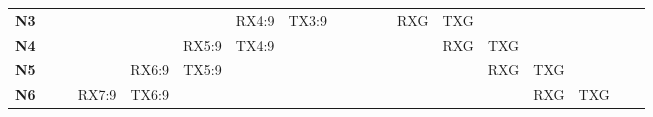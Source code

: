 \documentclass{tfgitic}[2024/07/01]
\begin{document}
{\begin{figure}
{\begin{tabular}{l||cccccccccccccccccc}
            \hhline{~||~~~~~---~~---~~~~~}
            \textbf{N3} &                          &                            &                            &                            & \multicolumn{1}{c|}{}      & \multicolumn{1}{c|}{RX4:9} & \multicolumn{1}{c|}{TX3:9} &                            &                            &                                                              & \multicolumn{1}{c|}{}                                        & \multicolumn{1}{c|}{{\cellcolor[rgb]{0.753,0.749,0.737}}RXG} & \multicolumn{1}{c|}{{\cellcolor[rgb]{0.753,0.749,0.737}}TXG} &                          &                          &                          &                          &                           \\ 
            \hhline{~||~~~~---~~~~---~~~~}
            \textbf{N4} &                          &                            &                            & \multicolumn{1}{c|}{}      & \multicolumn{1}{c|}{RX5:9} & \multicolumn{1}{c|}{TX4:9} &                            &                            &                            &                                                              &                                                              & \multicolumn{1}{c|}{}                                        & \multicolumn{1}{c|}{{\cellcolor[rgb]{0.753,0.749,0.737}}RXG} & \multicolumn{1}{c|}{TXG} &                          &                          &                          &                           \\ 
            \cline{5-7}\cline{14-16}
            \textbf{N5} &                          &                            & \multicolumn{1}{c|}{}      & \multicolumn{1}{c|}{RX6:9} & \multicolumn{1}{c|}{TX5:9} &                            &                            &                            &                            &                                                              &                                                              &                                                              & \multicolumn{1}{c|}{}                                        & \multicolumn{1}{c|}{RXG} & \multicolumn{1}{c|}{TXG} &                          &                          &                           \\ 
            \cline{4-6}\cline{15-17}
            \textbf{N6} &                          & \multicolumn{1}{c|}{}      & \multicolumn{1}{c|}{RX7:9} & \multicolumn{1}{c|}{TX6:9} &                            &                            &                            &                            &                            &                                                              &                                                              &                                                              &                                                              & \multicolumn{1}{c|}{}    & \multicolumn{1}{c|}{RXG} & \multicolumn{1}{c|}{TXG} &                          &                           \\ 

\end{tabular}}
\end{figure}}
\end{document}
